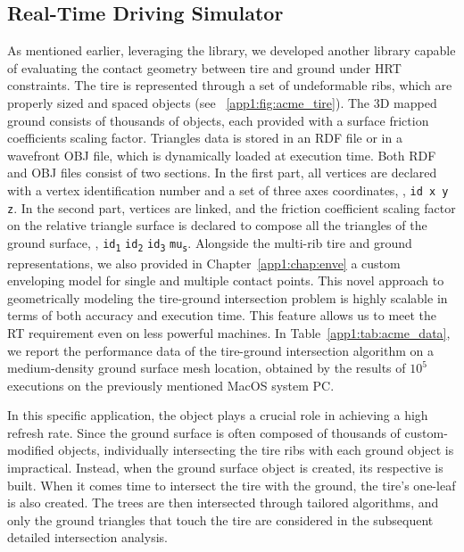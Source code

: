 \subsection{Real-Time Driving Simulator}
As mentioned earlier, leveraging the \Acme{} library, we developed another \cpp{} library capable of evaluating the contact geometry between tire and ground under \ac{HRT} constraints. The tire is represented through a set of undeformable ribs, which are properly sized and spaced \Disk{} objects (see \figurename{}~\ref{app1:fig:acme_tire}). The \ac{3D} mapped ground consists of thousands of \Triangle{} objects, each provided with a surface friction coefficients scaling factor. Triangles data is stored in an \ac{RDF} file or in a wavefront OBJ file, which is dynamically loaded at execution time. Both \ac{RDF} and OBJ files consist of two sections. In the first part, all vertices are declared with a vertex identification number and a set of three axes coordinates, \eg{}, \texttt{id x y z}. In the second part, vertices are linked, and the friction coefficient scaling factor on the relative triangle surface is declared to compose all the triangles of the ground surface, \eg{}, \texttt{id}\textsubscript{\texttt{1}} \texttt{id}\textsubscript{\texttt{2}} \texttt{id}\textsubscript{\texttt{3}} \texttt{mu}\textsubscript{\texttt{s}}. Alongside the multi-rib tire and ground representations, we also provided in Chapter~\ref{app1:chap:enve} a custom enveloping model for single and multiple contact points. This novel approach to geometrically modeling the tire-ground intersection problem is highly scalable in terms of both accuracy and execution time. This feature allows us to meet the \ac{RT} requirement even on less powerful machines. In Table~\ref{app1:tab:acme_data}, we report the performance data of the tire-ground intersection algorithm on a medium-density ground surface mesh location, obtained by the results of $10^5$ executions on the previously mentioned MacOS system \ac{PC}.

In this specific application, the \AabbTree{} object plays a crucial role in achieving a high refresh rate. Since the ground surface is often composed of thousands of custom-modified \Triangle{} objects, individually intersecting the tire ribs with each ground object is impractical. Instead, when the ground surface object is created, its respective \AabbTree{} is built. When it comes time to intersect the tire with the ground, the tire's one-leaf \AabbTree{} is also created. The trees are then intersected through tailored algorithms, and only the ground triangles that touch the tire \Aabb{} are considered in the subsequent detailed intersection analysis.

